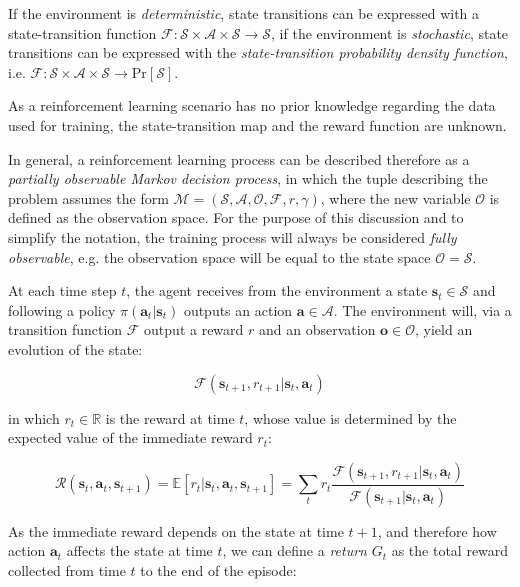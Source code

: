 If the environment is \textit{deterministic}, state transitions can be expressed with a state-transition function $\mathcal{F}: \mathcal{S} \times \mathcal{A} \times \mathcal{S} \rightarrow \mathcal{S}$, if the environment is \textit{stochastic}, state transitions can be expressed with the \textit{state-transition probability density function}, i.e. $\mathcal{F}: \mathcal{S} \times \mathcal{A} \times \mathcal{S} \rightarrow \mathrm{Pr}[\mathcal{S}]$.

As a reinforcement learning scenario has no prior knowledge regarding the data used for training, the state-transition map and the reward function are unknown.

In general, a reinforcement learning process can be described therefore as a \textit{partially observable Markov decision process}, in which the tuple describing the problem assumes the form $\mathcal{M} =  (\mathcal{S}, \mathcal{A}, \mathcal{O}, \mathcal{F}, r, \gamma)$, where the new variable $\mathcal{O}$ is defined as the observation space. For the purpose of this discussion and to simplify the notation, the training process will always be considered \textit{fully observable}, e.g. the observation space will be equal to the state space $\mathcal{O} = \mathcal{S}$.

At each time step $t$, the agent receives from the environment a state $\mathbf{s}_t \in \mathcal{S}$ and following a policy $\pi (\mathbf{a}_t | \mathbf{s}_t)$ outputs an action $\mathbf{a} \in \mathcal{A}$. The environment will, via a transition function $\mathcal{F}$ output a reward $r$ and an observation $\mathbf{o} \in \mathcal{O}$, yield an evolution of the state:

\begin{equation}
    \mathcal{F}(\mathbf{s} _{t+1}, r _{t+1} | \mathbf{s} _t, \mathbf{a} _t)
\end{equation}

in which $r_t \in \mathbb{R}$ is the reward at time $t$, whose value is determined by the expected value of the immediate reward $r_t$:

\begin{equation}
    \mathcal{R}(\mathbf{s} _t, \mathbf{a} _t, \mathbf{s} _{t+1}) = \mathbb{E} \left[ r _t | \mathbf{s} _t, \mathbf{a} _t, \mathbf{s} _{t+1} \right] = \sum _t r _t \frac{\mathcal{F}(\mathbf{s} _{t+1}, r _{t+1} | \mathbf{s} _t, \mathbf{a} _t)}{\mathcal{F}(\mathbf{s} _{t+1} | \mathbf{s} _t, \mathbf{a} _t)}
\end{equation}

As the immediate reward depends on the state at time $t+1$, and therefore how action $\mathbf{a} _t$ affects the state at time $t$, we can define a \textit{return} $G _t$ as the total reward collected from time $t$ to the end of the episode:

